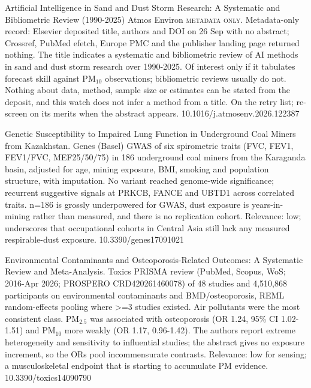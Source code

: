 \documentclass[10pt]{article}
\begin{document}
\par{}\baselineskip{}\baselineskip
{}

{Artificial Intelligence in Sand and Dust Storm Research: A Systematic and Bibliometric Review (1990-2025)}
{Atmos Environ}
{\textsc{metadata only.} Metadata-only record: Elsevier deposited title, authors and DOI on 26 Sep with no abstract; Crossref, PubMed efetch, Europe PMC and the publisher landing page returned nothing. The title indicates a systematic and bibliometric review of AI methods in sand and dust storm research over 1990-2025. Of interest only if it tabulates forecast skill against PM$_{10}$ observations; bibliometric reviews usually do not. Nothing about data, method, sample size or estimates can be stated from the deposit, and this watch does not infer a method from a title. On the retry list; re-screen on its merits when the abstract appears.}
{10.1016/j.atmosenv.2026.122387}

\par{}\baselineskip{}\baselineskip
{}

{Genetic Susceptibility to Impaired Lung Function in Underground Coal Miners from Kazakhstan.}
{Genes (Basel)}
{GWAS of six spirometric traits (FVC, FEV1, FEV1/FVC, MEF25/50/75) in 186 underground coal miners from the Karaganda basin, adjusted for age, mining exposure, BMI, smoking and population structure, with imputation. No variant reached genome-wide significance; recurrent suggestive signals at PRKCB, FANCE and UBTD1 across correlated traits. n=186 is grossly underpowered for GWAS, dust exposure is years-in-mining rather than measured, and there is no replication cohort. Relevance: low; underscores that occupational cohorts in Central Asia still lack any measured respirable-dust exposure.}
{10.3390/genes17091021}

\par{}\baselineskip{}\baselineskip
{}

{Environmental Contaminants and Osteoporosis-Related Outcomes: A Systematic Review and Meta-Analysis.}
{Toxics}
{PRISMA review (PubMed, Scopus, WoS; 2016-Apr 2026; PROSPERO CRD420261460078) of 48 studies and 4,510,868 participants on environmental contaminants and BMD/osteoporosis, REML random-effects pooling where >=3 studies existed. Air pollutants were the most consistent class. PM$_{2.5}$ was associated with osteoporosis (OR 1.24, 95\% CI 1.02-1.51) and PM$_{10}$ more weakly (OR 1.17, 0.96-1.42). The authors report extreme heterogeneity and sensitivity to influential studies; the abstract gives no exposure increment, so the ORs pool incommensurate contrasts. Relevance: low for sensing; a musculoskeletal endpoint that is starting to accumulate PM evidence.}
{10.3390/toxics14090790}
\end{document}
